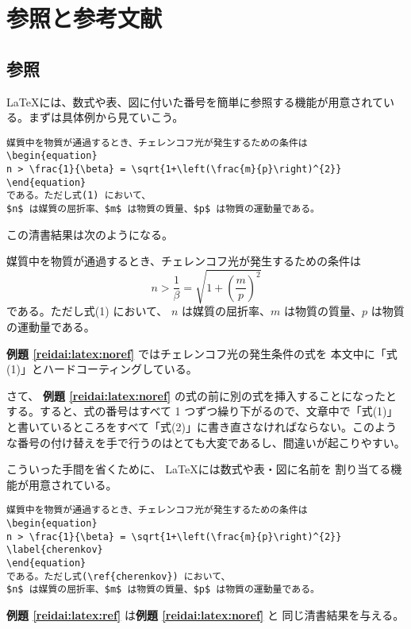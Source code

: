 \section{参照と参考文献}
\label{sec:latex:ref_and_bib}

\subsection{参照}
\label{sec:latex:reference}

\LaTeX には、数式や表、図に付いた番号を簡単に参照する機能が用意されている。まずは具体例から見ていこう。
\begin{reidai}
\label{reidai:latex:noref}
\begin{verbatim}
媒質中を物質が通過するとき、チェレンコフ光が発生するための条件は
\begin{equation}
n > \frac{1}{\beta} = \sqrt{1+\left(\frac{m}{p}\right)^{2}}
\end{equation}
である。ただし式(1) において、
$n$ は媒質の屈折率、$m$ は物質の質量、$p$ は物質の運動量である。
\end{verbatim}
\end{reidai} \noindent
この清書結果は次のようになる。
\begin{kekka}
  媒質中を物質が通過するとき、チェレンコフ光が発生するための条件は
  \begin{equation}
    n > \frac{1}{\beta} = \sqrt{1+\left(\frac{m}{p}\right)^{2}}
  \end{equation}
  である。ただし式(1) において、
  $n$ は媒質の屈折率、$m$ は物質の質量、$p$ は物質の運動量である。\\
\end{kekka} \noindent
\textbf{例題 \ref{reidai:latex:noref}} ではチェレンコフ光の発生条件の式を
本文中に「式(1)」とハードコーティングしている。

さて、 \textbf{例題 \ref{reidai:latex:noref}} の式の前に別の式を挿入することになったとする。すると、式の番号はすべて 1 つずつ繰り下がるので、文章中で「式(1)」と書いているところをすべて「式(2)」に書き直さなければならない。このような番号の付け替えを手で行うのはとても大変であるし、間違いが起こりやすい。

こういった手間を省くために、 \LaTeX には数式や表・図に名前を
割り当てる機能が用意されている。
\begin{reidai}
\label{reidai:latex:ref}
\begin{verbatim}
媒質中を物質が通過するとき、チェレンコフ光が発生するための条件は
\begin{equation}
n > \frac{1}{\beta} = \sqrt{1+\left(\frac{m}{p}\right)^{2}} \label{cherenkov}
\end{equation}
である。ただし式(\ref{cherenkov}) において、
$n$ は媒質の屈折率、$m$ は物質の質量、$p$ は物質の運動量である。
\end{verbatim}
\end{reidai} \noindent
\textbf{例題 \ref{reidai:latex:ref}} は\textbf{例題 \ref{reidai:latex:noref}} と
同じ清書結果を与える。

